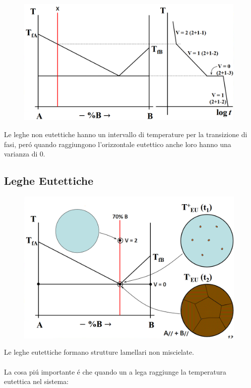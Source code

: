 \documentclass{article}
\begin{document}
{\begin{figure}[!h]
                    \centering
                    \includegraphics[width=.85\linewidth]{Curva di Raffreddamento per una lega non-eutettica esemplare.png}
                \end{figure}
                Le leghe non eutettiche hanno un intervallo di temperature per la transizione di fasi, per\'o quando raggiungono l'orizzontale eutettico anche loro hanno una varianza di 0.
                \newpage
        \subsection{Leghe Eutettiche}
            \begin{figure}[!h]
                \centering
                \includegraphics[width=.85\linewidth]{Diagramma di cambio strutturale in un sistema completamente immiscibile binario - Parte 1.png}
            \end{figure}
            Le leghe eutettiche formano strutture lamellari non miscielate. \\ \\
            La cosa pi\'u importante \'e che quando un a lega raggiunge la temperatura eutettica nel sistema:\\ \\
}
\end{document}
